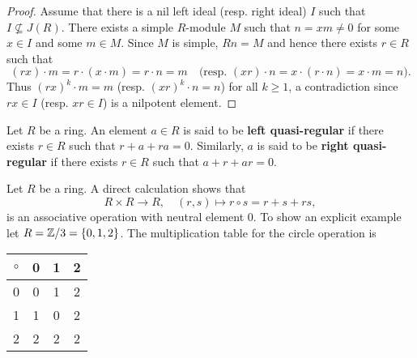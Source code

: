 \begin{proof}
	Assume that there is a nil left ideal (resp. right ideal) $I$ such that 
	$I\not\subseteq J(R)$. There exists a simple $R$-module $M$ such that 
	$n=xm\ne 0$ for some $x\in I$ and some $m\in M$. Since $M$ is simple,
	$Rn=M$ and hence there exists $r\in R$ such that 
	\[
	(rx)\cdot m=r\cdot (x\cdot m)=r\cdot n=m\quad\text{(resp.
	$(xr)\cdot n=x\cdot (r\cdot n)=x\cdot m=n$).}
	\]
	Thus $(rx)^k\cdot m=m$ (resp. $(xr)^k\cdot n=n$) for all 
	$k\geq1$, a contradiction since $rx\in I$ (resp. $xr\in I$) is a nilpotent element. 
\end{proof}

\begin{definition}
Let $R$ be a ring. An element $a\in R$ is said to be 
\textbf{left quasi-regular} if there exists $r\in R$ such that $r+a+ra=0$. Similarly, 
$a$ is said to be \textbf{right quasi-regular} if there exists $r\in R$ such that $a+r+ar=0$. 
\end{definition}

Let $R$ be a ring. A direct calculation shows that
\[
R\times R\to R,
\quad
(r,s)\mapsto r\circ s=r+s+rs,
\]
is an associative operation with neutral element $0$.
To show an explicit example let $R=\mathbb{Z}/3=\{0,1,2\}$. 
The multiplication table for the circle 
operation is  
	\begin{table}[ht]
		\centering
		\begin{tabular}{c|ccc}
			$\circ$ & 0 & 1 & 2\tabularnewline
			\hline
			0 & 0 & 1 & 2\tabularnewline
			1 & 1 & 0 & 2\tabularnewline
			2 & 2 & 2 & 2\tabularnewline
		\end{tabular}
 	\end{table}


